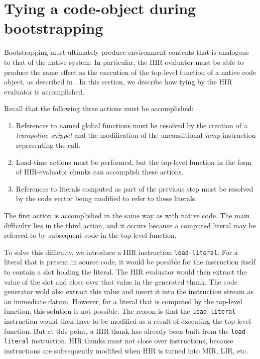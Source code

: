 \section{Tying a code-object during bootstrapping}
\label{sec-tying-a-code-object-during-bootstrapping}

Bootstrapping must ultimately produce environment contents that is
analogous to that of the native system.  In particular, the HIR
evaluator must be able to produce the same effect as the execution of
the top-level function of a native code object, as described in
.  In this section, we describe how
tying by the HIR evaluator is accomplished.

Recall that the following three actions must be accomplished:

\begin{enumerate}
\item References to named global functions must be resolved by the
  creation of a \emph{trampoline snippet} and the modification of the
  unconditional \emph{jump} instruction representing the call.
\item Load-time actions must be performed, but the top-level function
  in the form of HIR-evaluator chunks can accomplish these actions.
\item References to literals computed as part of the previous step must
  be resolved by the code vector being modified to refer to these
  literals.
\end{enumerate}

The first action is accomplished in the same way as with native code.
The main difficulty lies in the third action, and it occurs because a
computed literal may be referred to by subsequent code in the
top-level function.

To solve this difficulty, we introduce a HIR instruction
\texttt{load-literal}.  For a literal that is present in source code,
it would be possible for the instruction itself to contain a slot
holding the literal.  The HIR evaluator would then extract the value
of the slot and close over that value in the generated thunk.  The
code generator wold also extract this value and insert it into the
instruction stream as an immediate datum.  However, for a literal that
is computed by the top-level function, this solution is not possible.
The reason is that the \texttt{load-literal} instruction would then
have to be modified as a result of executing the top-level function.
But at this point, a HIR thunk has already been built from the
\texttt{load-literal} instruction.  HIR thunks must not close over
instructions, because instructions are subsequently modified when HIR
is turned into MIR, LIR, etc.

